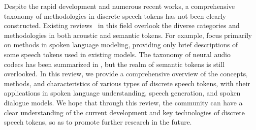 Despite the rapid development and numerous recent works, a comprehensive taxonomy of methodologies in discrete speech tokens has not been clearly constructed. 
Existing reviews~\cite{mohamed2022self,anees2024speech,wu2024towards,cui2024recent,kim2024neural,ji2024wavchat} in this field overlook the diverse categories and methodologies in both acoustic and semantic tokens.
For example, \cite{cui2024recent,ji2024wavchat} focus primarily on methods in spoken language modeling, providing only brief descriptions of some speech tokens used in existing models.
The taxonomy of neural audio codecs has been summarized in \cite{wu2024towards,du2025codecfake}, but the realm of semantic tokens is still overlooked.
In this review, we provide a comprehensive overview of the concepts, methods, and characteristics of various types of discrete speech tokens, with their applications in spoken language understanding, speech generation, and spoken dialogue models.
We hope that through this review, the community can have a clear understanding of the current development and key technologies of discrete speech tokens, so as to promote further research in the future.


